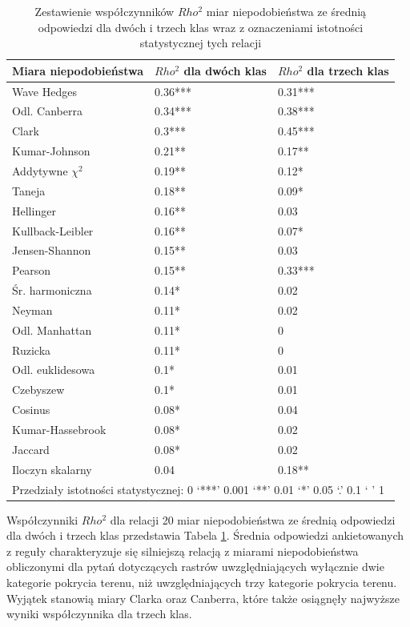 \documentclass{amuthesis}
\begin{document}
\hypertarget{tbl-corr_table_fixed}{}
\begin{table}
\caption{\label{tbl-corr_table_fixed}Zestawienie współczynników \(Rho^2\) miar niepodobieństwa ze średnią
odpowiedzi dla dwóch i trzech klas wraz z oznaczeniami istotności
statystycznej tych relacji }\tabularnewline

\centering
\begin{tabular}{lll}
\toprule
Miara niepodobieństwa & $Rho^2$ dla dwóch klas & $Rho^2$ dla trzech klas\\
\midrule
Wave Hedges & 0.36*** & 0.31***\\
Odl. Canberra & 0.34*** & 0.38***\\
Clark & 0.3*** & 0.45***\\
Kumar-Johnson & 0.21** & 0.17**\\
Addytywne $\chi^2$ & 0.19** & 0.12*\\
Taneja & 0.18** & 0.09*\\
Hellinger & 0.16** & 0.03\\
Kullback-Leibler & 0.16** & 0.07*\\
Jensen-Shannon & 0.15** & 0.03\\
Pearson & 0.15** & 0.33***\\
Śr. harmoniczna & 0.14* & 0.02\\
Neyman & 0.11* & 0.02\\
Odl. Manhattan & 0.11* & 0\\
Ruzicka & 0.11* & 0\\
Odl. euklidesowa & 0.1* & 0.01\\
Czebyszew & 0.1* & 0.01\\
Cosinus & 0.08* & 0.04\\
Kumar-Hassebrook & 0.08* & 0.02\\
Jaccard & 0.08* & 0.02\\
Iloczyn skalarny & 0.04 & 0.18**\\
\bottomrule
\multicolumn{3}{l}{\rule{0pt}{1em}Przedziały istotności statystycznej:  0 ‘***’ 0.001 ‘**’ 0.01 ‘*’ 0.05 ‘.’ 0.1 ‘ ’ 1}\\
\end{tabular}
\end{table}

Współczynniki \(Rho^2\) dla relacji 20 miar niepodobieństwa ze średnią
odpowiedzi dla dwóch i trzech klas przedstawia Tabela
\ref{tbl-corr_table_fixed}. Średnia odpowiedzi ankietowanych z reguły
charakteryzuje się silniejszą relacją z miarami niepodobieństwa
obliczonymi dla pytań dotyczących rastrów uwzględniających wyłącznie
dwie kategorie pokrycia terenu, niż uwzględniających trzy kategorie
pokrycia terenu. Wyjątek stanowią miary Clarka oraz Canberra, które
także osiągnęły najwyższe wyniki współczynnika dla trzech klas.
\end{document}
